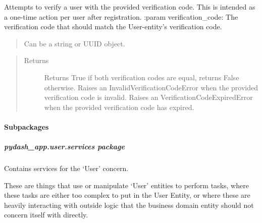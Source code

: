 \documentclass[letterpaper,10pt,english]{sphinxmanual}
\begin{document}
\begin{fulllineitems}
\begin{quote}
\begin{description}
\end{description}\end{quote}

\end{fulllineitems}


\begin{fulllineitems}
\label{\detokenize{pydash_app.user:pydash_app.user.verify}}
Attempts to verify a user with the provided verification code.
This is intended as a one-time action per user after registration.
:param verification\_code: The verification code that should match the User-entity’s verification code.
\begin{quote}

Can be a string or UUID object.
\end{quote}
\begin{quote}\begin{description}
\item[{Returns}] \leavevmode
Returns True if both verification codes are equal, returns False otherwise.
Raises an InvalidVerificationCodeError when the provided verification code is invalid.
Raises an VerificationCodeExpiredError when the provided verification code has expired.

\end{description}\end{quote}

\end{fulllineitems}



\paragraph{Subpackages}
\label{\detokenize{pydash_app.user:subpackages}}

\subparagraph{pydash\_app.user.services package}
\label{\detokenize{pydash_app.user.services:pydash-app-user-services-package}}\label{\detokenize{pydash_app.user.services:module-pydash_app.user.services}}\label{\detokenize{pydash_app.user.services::doc}}
Contains services for the ‘User’ concern.

These are things that use or manipulate ‘User’ entities to perform tasks,
where these tasks are either too complex to put in the User Entity,
or where these are heavily interacting with outside logic that the business domain entity should not concern itself with directly.
\end{document}
